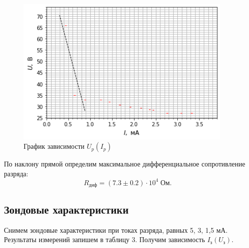 \documentclass[a4paper]{article}
\theoremstyle{definition}
\theoremstyle{remark}
\begin{document}
    \begin{figure}[h!]
        \centering
        \includegraphics[width = 300pt]{image/graph2.png}
        \caption{График зависимости $U_p(I_p)$}
    \end{figure}

    По наклону прямой определим максимальное дифференциальное сопротивление разряда: $$R_{\text{диф}} = (7.3 \pm 0.2)\cdot 10^4 \; \text{Ом}.$$

    \subsection{Зондовые характеристики}

    Снимем зондовые характеристики при токах разряда, равных 5, 3, 1,5 мА. Результаты измерений запишем в таблицу 3. Получим зависимость $I_{\text{з}}(U_{\text{з}})$.
\end{document}
